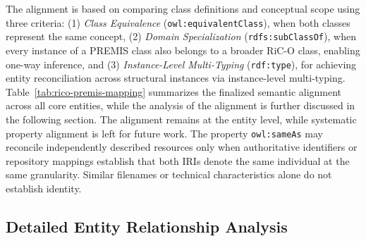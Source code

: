 \documentclass[runningheads]{llncs}
\begin{document}
 The alignment is based on comparing class definitions and conceptual scope using three criteria: 
 (1) \textit{Class Equivalence} (\texttt{owl:equivalentClass}), when both classes represent the same concept, (2) \textit{Domain Specialization} (\texttt{rdfs:subClassOf}), when every instance of a PREMIS class also belongs to a broader RiC-O class, enabling one-way inference, and (3) \textit{Instance-Level Multi-Typing} (\texttt{rdf:type}), for achieving entity reconciliation across structural instances via instance-level multi-typing.
 Table~\ref{tab:rico-premis-mapping} summarizes the finalized semantic alignment across all core entities, while the analysis of the alignment is further discussed in the following section. The alignment remains at the entity level, while systematic property alignment is left for future work.
The property \texttt{owl:sameAs} may reconcile independently described resources only when authoritative identifiers or repository mappings establish that both IRIs denote the same individual at the same granularity. Similar filenames or technical characteristics alone do not establish identity.

\subsection{Detailed Entity Relationship Analysis}
\label{subsec:detailed-alignment}

\end{document}
